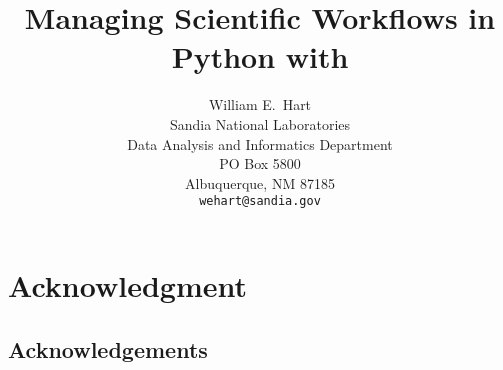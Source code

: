 \documentclass[pdf,ps2pdf,12pt,report,OUO]{SANDreport}
\title{Managing Scientific Workflows in Python with \code{pyutilib.workflow}}
\author{William E.\ Hart\\
        Sandia National Laboratories\\
        Data Analysis and Informatics Department\\
        PO Box 5800\\
        Albuquerque, NM 87185\\
        {\tt wehart@sandia.gov}
	 }
\date{}
\begin{document}
    \maketitle

    \begin{abstract}
    
    \end{abstract}


    \clearpage
    \chapter*{Acknowledgment}
    \section*{Acknowledgements}




    \cleardoublepage		%
    \tableofcontents
    \listoffigures




\end{document}
